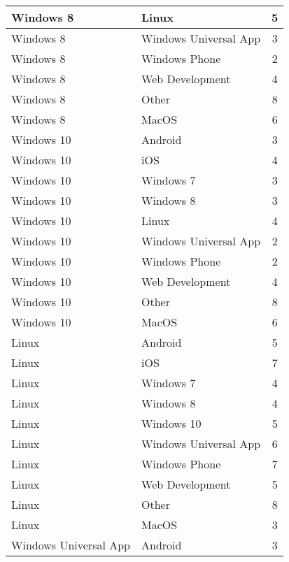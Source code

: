 \begin{table}[h]
	\centering 
	\setlength{\tabcolsep}{4pt}
	\begin{tabular}{|l|l|c|}\hline
	Windows 8  			& Linux 				& 5     		\\ \hline
	Windows 8  			& Windows Universal App 				& 3     		\\ \hline
	Windows 8  			& Windows Phone 				& 2     		\\ \hline
	Windows 8  			& Web Development 				& 4     		\\ \hline
	Windows 8  			& Other 				& 8     		\\ \hline
	Windows 8  			& MacOS 				& 6     		\\ \hline
	Windows 10  			& Android 				& 3     		\\ \hline
	Windows 10  			& iOS 				& 4     		\\ \hline
	Windows 10  			& Windows 7 				& 3     		\\ \hline
	Windows 10  			& Windows 8 				& 3     		\\ \hline
	Windows 10  			& Linux 				& 4     		\\ \hline
	Windows 10  			& Windows Universal App 				& 2     		\\ \hline
	Windows 10  			& Windows Phone 				& 2     		\\ \hline
	Windows 10  			& Web Development 				& 4     		\\ \hline
	Windows 10  			& Other 				& 8     		\\ \hline
	Windows 10  			& MacOS 				& 6     		\\ \hline
	Linux  			& Android 				& 5     		\\ \hline
	Linux  			& iOS 				& 7     		\\ \hline
	Linux  			& Windows 7 				& 4     		\\ \hline
	Linux  			& Windows 8 				& 4     		\\ \hline
	Linux  			& Windows 10				& 5     		\\ \hline
	Linux  			& Windows Universal App 				& 6     		\\ \hline
	Linux  			& Windows Phone 				& 7     		\\ \hline
	Linux  			& Web Development 				& 5     		\\ \hline
	Linux  			& Other 				& 8     		\\ \hline
	Linux  			& MacOS 				& 3     		\\ \hline
	Windows Universal App  			& Android 				& 3     		\\ \hline

\end{tabular}
\end{table}
